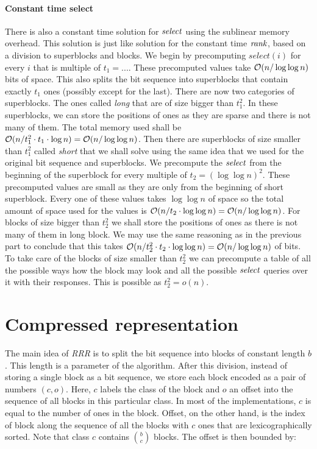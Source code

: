\paragraph{Constant time select}

There is also a constant time solution for $\mathit{select}$ using the sublinear memory overhead.
This solution is just like solution for the constant time $\mathit{rank}$, based on a division
to superblocks and blocks. We begin by precomputing $select(i)$ for every $i$ that is
multiple of $t_1=...$. These precomputed values take $\mathcal{O}(n/\log\log n)$ bits of space.
This also splits the bit sequence into superblocks that contain exactly $t_1$ ones (possibly
except for the last). There are
now two categories of superblocks. The ones called \textit{long} that are of size bigger
than $t_1^2$. In these superblocks, we can store the positions of ones as they are sparse
and there is not many of them. The total memory used shall be $\mathcal{O}(n/t_1^2\cdot t_1\cdot
\log n) = \mathcal{O}(n/\log\log n)$. Then there are superblocks of size smaller than $t_1^2$ called
\textit{short} that we shall solve using the same idea that we used for the original bit sequence
and superblocks. We precompute the $\mathit{select}$ from the beginning of the superblock for every
multiple of $t_2=(\log\log n)^2$. These precomputed values are small as they are only from the
beginning of short superblock. Every one of these values takes $\log\log n$ of space so the
total amount of space used for the values is $\mathcal{O}(n/t_2\cdot \log\log n) = \mathcal{O}(n/\log\log n)$.
For blocks of size bigger than $t_2^2$ we shall store the positions of ones as there is not
many of them in long block. We may use the same reasoning as in the previous part to conclude
that this takes $\mathcal{O}(n/t_2^2\cdot t_2\cdot \log\log n) = \mathcal{O}(n/\log\log n)$ of bits. To
take care of the blocks of size smaller than $t_2^2$ we can precompute a table of all the
possible ways how the block may look and all the possible $\mathit{select}$ queries over it with
their responses. This is possible as $t_2^2 = o(n)$.

\section{Compressed representation}
\label{section:compressed_bv}

The main idea of \textit{RRR} is to split the bit sequence into blocks of constant length
$b$. This length is a parameter of the algorithm. After this division, instead
of storing a single block as a bit sequence, we store each block encoded as a pair
of numbers $(c, o)$. Here, $c$ labels the class of the block and $o$ an offset into
the sequence of all blocks in this particular class. In most of the implementations,
$c$ is equal to the number of ones in the block. Offset, on the other hand, is the
index of block along the sequence of all the blocks with $c$ ones that are lexicographically
sorted. Note that class $c$ contains ${b\choose c}$ blocks. The offset is then bounded by:

